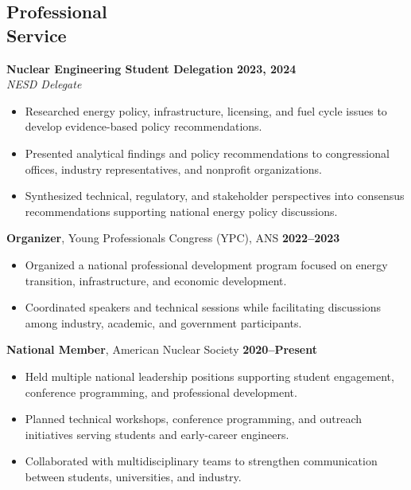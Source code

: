 \documentclass[margin,line]{resume}
\begin{document}
\begin{resume}
    \section{\mysidestyle Professional\\Service}

    \textbf{Nuclear Engineering Student Delegation} \hfill \textbf{2023, 2024} \\
    \textsl{NESD Delegate} \\
    \begin{itemize}
        \item Researched energy policy, infrastructure, licensing, and fuel cycle issues to develop evidence-based policy recommendations.
        \item Presented analytical findings and policy recommendations to congressional offices, industry representatives, and nonprofit organizations.
        \item Synthesized technical, regulatory, and stakeholder perspectives into consensus recommendations supporting national energy policy discussions.
    \end{itemize}

    \textbf{Organizer}, Young Professionals Congress (YPC), ANS \hfill \textbf{2022--2023}\vspace{.5mm}\\%
    \begin{itemize}
        \item Organized a national professional development program focused on energy transition, infrastructure, and economic development.
        \item Coordinated speakers and technical sessions while facilitating discussions among industry, academic, and government participants.
    \end{itemize}

    \textbf{National Member}, American Nuclear Society \hfill \textbf{2020--Present}\vspace{.5mm}\\%
    \begin{itemize}
        \item Held multiple national leadership positions supporting student engagement, conference programming, and professional development.
        \item Planned technical workshops, conference programming, and outreach initiatives serving students and early-career engineers.
        \item Collaborated with multidisciplinary teams to strengthen communication between students, universities, and industry.
    \end{itemize}


\end{resume}
\end{document}
